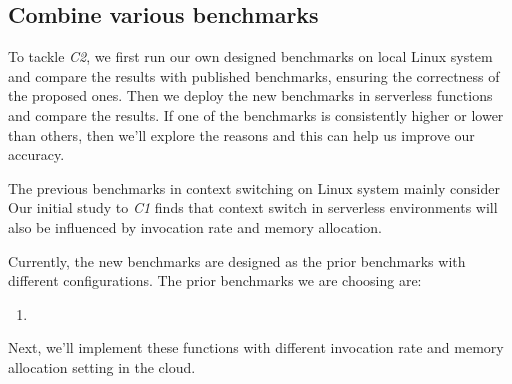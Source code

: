 \subsection{Combine various benchmarks}
	To tackle \emph{C2}, we first run our own designed benchmarks on local Linux system and compare the results with published benchmarks\cite{cs-lmbench,cs-pipes,cs-arm,cs-web},
	 ensuring the correctness of the proposed ones. Then we deploy the new benchmarks in serverless functions and compare the results. 
	 If one of the benchmarks is consistently higher or lower than others, then we'll explore the reasons and this can help us improve our accuracy.

	The previous benchmarks in context switching on Linux system mainly consider %
	Our initial study to \emph{C1} finds that context switch in serverless environments will also be influenced by invocation rate and memory allocation.   

	Currently, the new benchmarks are designed as the prior benchmarks with different configurations.
	The prior benchmarks we are choosing are:
	\begin{enumerate}
		\item 
	\end{enumerate}
	Next, we'll implement these functions with different invocation rate and memory allocation setting in the cloud.

